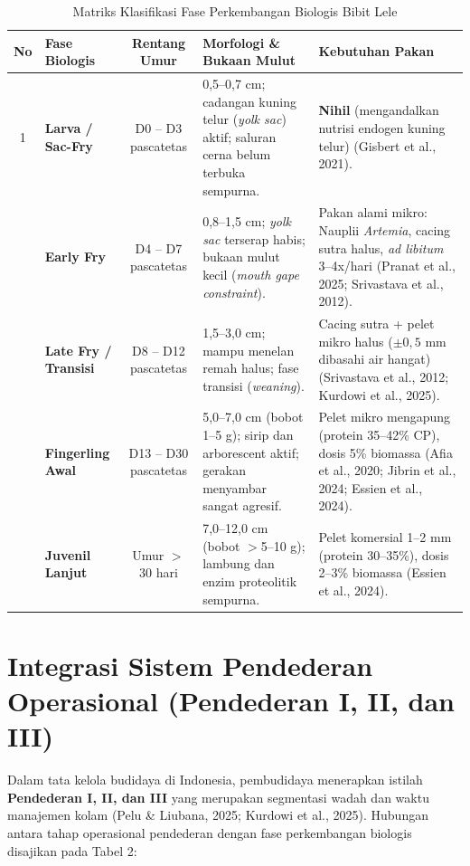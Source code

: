 \documentclass[11pt,a4paper]{article}
\begin{document}
\begin{table}[h!]
\centering
\small
\caption{Matriks Klasifikasi Fase Perkembangan Biologis Bibit Lele}
\vspace{4pt}
\begin{tabularx}{\textwidth}{c p{2.6cm} c X p{3.8cm}}
\toprule
\textbf{No} & \textbf{Fase Biologis} & \textbf{Rentang Umur} & \textbf{Morfologi \& Bukaan Mulut} & \textbf{Kebutuhan Pakan} \\
\midrule
1 & \textbf{Larva / Sac-Fry} & D0 -- D3 pascatetas & 0,5--0,7 cm; cadangan kuning telur (\textit{yolk sac}) aktif; saluran cerna belum terbuka sempurna. & \textbf{Nihil} (mengandalkan nutrisi endogen kuning telur) (Gisbert et al., 2021). \\
\addlinespace
2 & \textbf{Early Fry} & D4 -- D7 pascatetas & 0,8--1,5 cm; \textit{yolk sac} terserap habis; bukaan mulut kecil (\textit{mouth gape constraint}). & Pakan alami mikro: Nauplii \textit{Artemia}, cacing sutra halus, \textit{ad libitum} 3--4x/hari (Pranat et al., 2025; Srivastava et al., 2012). \\
\addlinespace
3 & \textbf{Late Fry / Transisi} & D8 -- D12 pascatetas & 1,5--3,0 cm; mampu menelan remah halus; fase transisi (\textit{weaning}). & Cacing sutra + pelet mikro halus ($\pm 0,5$ mm dibasahi air hangat) (Srivastava et al., 2012; Kurdowi et al., 2025). \\
\addlinespace
4 & \textbf{Fingerling Awal} & D13 -- D30 pascatetas & 5,0--7,0 cm (bobot 1--5 g); sirip dan arborescent aktif; gerakan menyambar sangat agresif. & Pelet mikro mengapung (protein 35--42\% CP), dosis 5\% biomassa (Afia et al., 2020; Jibrin et al., 2024; Essien et al., 2024). \\
\addlinespace
5 & \textbf{Juvenil Lanjut} & Umur $>$30 hari & 7,0--12,0 cm (bobot $>$5--10 g); lambung dan enzim proteolitik sempurna. & Pelet komersial 1--2 mm (protein 30--35\%), dosis 2--3\% biomassa (Essien et al., 2024). \\
\bottomrule
\end{tabularx}
\end{table}

\section{Integrasi Sistem Pendederan Operasional (Pendederan I, II, dan III)}
Dalam tata kelola budidaya di Indonesia, pembudidaya menerapkan istilah \textbf{Pendederan I, II, dan III} yang merupakan segmentasi wadah dan waktu manajemen kolam (Pelu \& Liubana, 2025; Kurdowi et al., 2025). Hubungan antara tahap operasional pendederan dengan fase perkembangan biologis disajikan pada Tabel 2:
\end{document}

